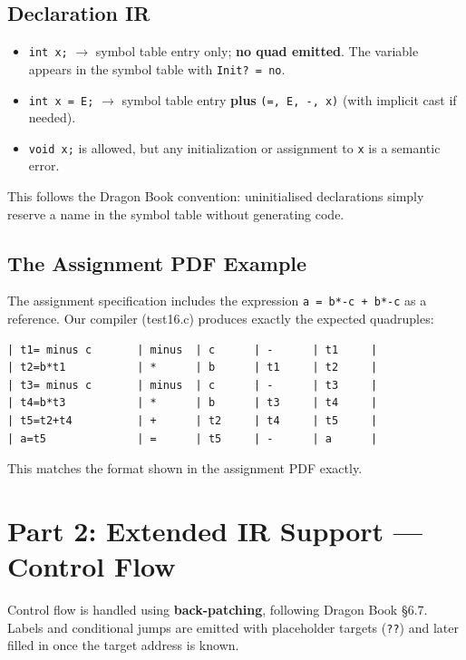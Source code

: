 \documentclass[11pt]{article}
\begin{document}
\subsection{Declaration IR}

\begin{itemize}
    \item \texttt{int x;} $\rightarrow$ symbol table entry only; \textbf{no quad emitted}. The variable appears in the symbol table with \texttt{Init? = no}.
    \item \texttt{int x = E;} $\rightarrow$ symbol table entry \textbf{plus} \texttt{(=, E, -, x)} (with implicit cast if needed).
    \item \texttt{void x;} is allowed, but any initialization or assignment to \texttt{x} is a semantic error.
\end{itemize}

This follows the Dragon Book convention: uninitialised declarations simply reserve a name in the symbol table without generating code.

\subsection{The Assignment PDF Example}

The assignment specification includes the expression \texttt{a = b*-c + b*-c} as a reference. Our compiler (test16.c) produces exactly the expected quadruples:

\begin{lstlisting}[style=outputstyle]
| t1= minus c       | minus  | c      | -      | t1     |
| t2=b*t1           | *      | b      | t1     | t2     |
| t3= minus c       | minus  | c      | -      | t3     |
| t4=b*t3           | *      | b      | t3     | t4     |
| t5=t2+t4          | +      | t2     | t4     | t5     |
| a=t5              | =      | t5     | -      | a      |
\end{lstlisting}

This matches the format shown in the assignment PDF exactly.

\section{Part 2: Extended IR Support --- Control Flow}

Control flow is handled using \textbf{back-patching}, following Dragon Book \S6.7. Labels and conditional jumps are emitted with placeholder targets (\texttt{??}) and later filled in once the target address is known.
\end{document}
